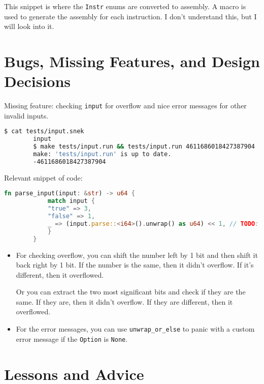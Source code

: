	This snippet is where the \verb|Instr| enums are converted to assembly. A macro is used to generate the assembly for each instruction. I don't understand this, but I will look into it.

	\section{Bugs, Missing Features, and Design Decisions}

	Missing feature: checking \verb|input| for overflow and nice error messages for other invalid inputs.

	\begin{lstlisting}[language=bash, numbers=none]
		$ cat tests/input.snek
		input
		$ make tests/input.run && tests/input.run 4611686018427387904
		make: 'tests/input.run' is up to date.
		-4611686018427387904
	\end{lstlisting}

	Relevant snippet of code:

	\begin{lstlisting}[language=Rust, title=\texttt{runtime/start.rs}]
		fn parse_input(input: &str) -> u64 {
		    match input {
			"true" => 3,
			"false" => 1,
			_ => (input.parse::<i64>().unwrap() as u64) << 1, // TODO: check for overflow
		    }
		}
	\end{lstlisting}

	\begin{itemize}
		\item For checking overflow, you can shift the number left by 1 bit and then shift it back right by 1 bit. If the number is the same, then it didn't overflow. If it's different, then it overflowed.

			Or you can extract the two most significant bits and check if they are the same. If they are, then it didn't overflow. If they are different, then it overflowed.

		\item For the error messages, you can use \verb|unwrap_or_else| to panic with a custom error message if the \verb|Option| is \verb|None|.
	\end{itemize}

	\section{Lessons and Advice}


